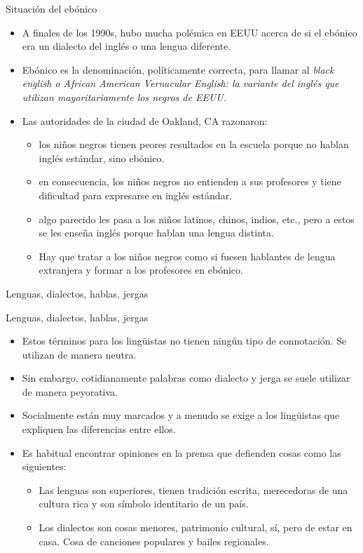 \documentclass[handout]{beamer}
\begin{document}
\begin{frame}{Situación del ebónico}
\begin{itemize}
	\item A finales de los 1990s, hubo mucha polémica en EEUU acerca de si el ebónico era un dialecto del inglés o una lengua diferente.
	\item Ebónico es la denominación, políticamente correcta, para llamar al \it{black english} o \it{African American Vernacular English}: la variante del inglés que utilizan mayoritariamente los negros de EEUU.
	\item Las autoridades de la ciudad de Oakland, CA razonaron:
	\begin{itemize}
		\item los niños negros tienen peores resultados en la escuela porque no hablan inglés estándar, sino ebónico.
		\item en consecuencia, los niños negros no entienden a sus profesores y tiene dificultad para expresarse en inglés estándar.
		\item algo parecido les pasa a los niños latinos, chinos, indios, etc., pero a estos se les enseña inglés porque hablan una lengua distinta.
		\item Hay que tratar a los niños negros como si fuesen hablantes de lengua extranjera y formar a los profesores en ebónico.
	\end{itemize}
\end{itemize}
\end{frame}

\begin{frame}{}
\begin{center}
\LARGE Lenguas, dialectos, hablas, jergas
\end{center}
\end{frame}


\begin{frame}{Lenguas, dialectos, hablas, jergas}
\begin{itemize}
	\item Estos términos para los lingüistas no tienen ningún tipo de connotación. Se utilizan de manera neutra.
	\item Sin embargo, cotidianamente palabras como dialecto y jerga se suele utilizar de manera peyorativa.
	\item Socialmente están muy marcados y a menudo se exige a los lingüistas que expliquen las diferencias entre ellos.
	\item Es habitual encontrar opiniones en la prensa que defienden cosas como las siguientes:
	\begin{itemize}
		\item Las lenguas son superiores, tienen tradición escrita, merecedoras de una cultura rica y son símbolo identitario de un país.
		\item Los dialectos son cosas menores, patrimonio cultural, sí, pero de estar en casa. Cosa de canciones populares y bailes regionales.
	\end{itemize}
\end{itemize}
\end{frame}
\end{document}
